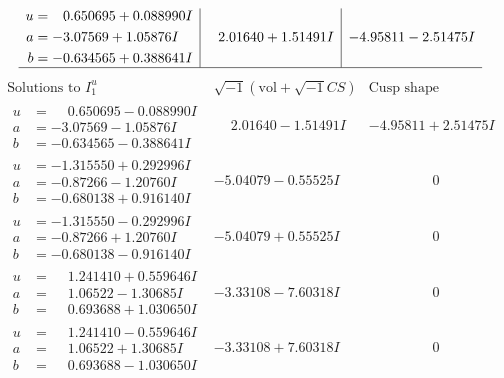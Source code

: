 \documentclass[1p]{elsarticle_modified}
\theoremstyle{definition}
\newcommand{\I}{\sqrt{-1}}
\begin{document}
$$\begin{array}{c|c|c}
\begin{aligned}
u &= \phantom{-}0.650695 + 0.088990 I \\
a &= -3.07569 + 1.05876 I \\
b &= -0.634565 + 0.388641 I\end{aligned}
 & \phantom{-}2.01640 + 1.51491 I & -4.95811 - 2.51475 I\\
 \hline 
 \end{array}$$\newpage$$\begin{array}{c|c|c}  
\text{Solutions to }I^u_{1}& \I (\text{vol} + \sqrt{-1}CS) & \text{Cusp shape}\\
 \hline 
\begin{aligned}
u &= \phantom{-}0.650695 - 0.088990 I \\
a &= -3.07569 - 1.05876 I \\
b &= -0.634565 - 0.388641 I\end{aligned}
 & \phantom{-}2.01640 - 1.51491 I & -4.95811 + 2.51475 I \\ \hline\begin{aligned}
u &= -1.315550 + 0.292996 I \\
a &= -0.87266 - 1.20760 I \\
b &= -0.680138 + 0.916140 I\end{aligned}
 & -5.04079 - 0.55525 I & \phantom{-0.000000 } 0 \\ \hline\begin{aligned}
u &= -1.315550 - 0.292996 I \\
a &= -0.87266 + 1.20760 I \\
b &= -0.680138 - 0.916140 I\end{aligned}
 & -5.04079 + 0.55525 I & \phantom{-0.000000 } 0 \\ \hline\begin{aligned}
u &= \phantom{-}1.241410 + 0.559646 I \\
a &= \phantom{-}1.06522 - 1.30685 I \\
b &= \phantom{-}0.693688 + 1.030650 I\end{aligned}
 & -3.33108 - 7.60318 I & \phantom{-0.000000 } 0 \\ \hline\begin{aligned}
u &= \phantom{-}1.241410 - 0.559646 I \\
a &= \phantom{-}1.06522 + 1.30685 I \\
b &= \phantom{-}0.693688 - 1.030650 I\end{aligned}
 & -3.33108 + 7.60318 I & \phantom{-0.000000 } 0 \\ \hline\begin{aligned}

\end{aligned}
\end{array}$$
\end{document}
